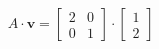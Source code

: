 \documentclass[preview]{standalone}
\begin{document}
\begin{align*}
A \cdot \mathbf{v} = \begin{bmatrix} 2 & 0 \\ 0 & 1 \end{bmatrix} \cdot \begin{bmatrix} 1 \\ 2 \end{bmatrix}
\end{align*}
\end{document}
